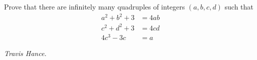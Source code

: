 Prove that there are infinitely many quadruples of integers $(a,b,c,d)$ such that
\begin{align*}
a^2 + b^2 + 3 &= 4ab\\
c^2 + d^2 + 3 &= 4cd\\
4c^3 - 3c &= a
\end{align*}

\textit{Travis Hance.}